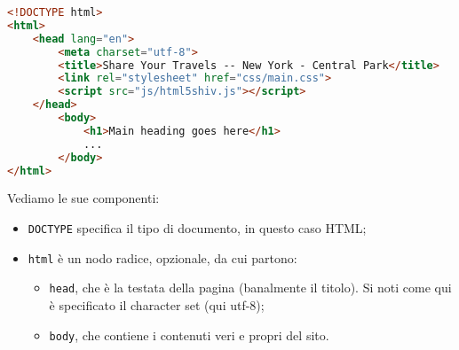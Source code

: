 \documentclass[a4paper,11pt]{article}
\begin{document}
\begin{lstlisting}[language=html, style=codestyle]	
<!DOCTYPE html>
<html>
	<head lang="en">
		<meta charset="utf-8">
		<title>Share Your Travels -- New York - Central Park</title>
		<link rel="stylesheet" href="css/main.css">
		<script src="js/html5shiv.js"></script>
	</head>
		<body>
			<h1>Main heading goes here</h1>
			...
		</body>
</html>
\end{lstlisting}

Vediamo le sue componenti:

\begin{itemize}
	\item \texttt{DOCTYPE} specifica il tipo di documento, in questo caso HTML;
	\item \texttt{html} è un nodo radice, opzionale, da cui partono:
		\begin{itemize}
			\item \texttt{head}, che è la testata della pagina (banalmente il titolo).
				Si noti come qui è specificato il character set (qui utf-8);
			\item \texttt{body}, che contiene i contenuti veri e propri del sito.
		\end{itemize}
\end{itemize}
\end{document}
